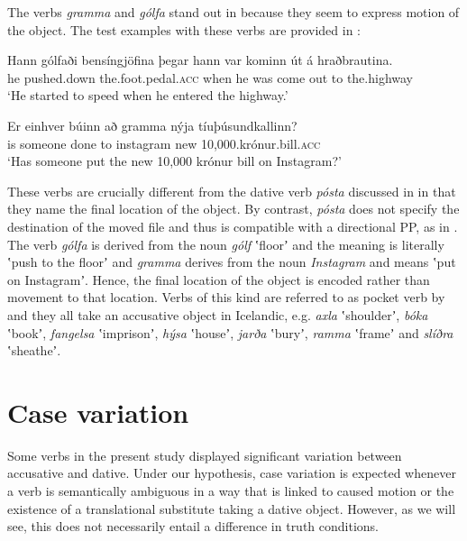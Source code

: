 \documentclass[output=paper,modfonts,nonflat,colorlinks,citecolor=brown]{langsci/langscibook}
\begin{document}
The verbs \textit{gramma} and \textit{gólfa} stand out in  because they seem to express motion of the object. The test examples with these verbs are provided in :



\ea%
    \label{ex:jonsson:6}
    \ea
\gll  Hann  gólfaði  bensíngjöfina  þegar  hann  var  kominn  út  á  hraðbrautina.\\
   he  pushed.down  the.foot.pedal.\textsc{acc}  when  he  was  come  out  to  the.highway\\
   \glt `He started to speed when he entered the highway.'

\ex
\gll   Er  einhver  búinn  að  gramma  nýja  tíuþúsundkallinn?\\
 is  someone  done  to  instagram  new  10,000.krónur.bill.\textsc{acc}\\
\glt `Has someone put the new 10,000 krónur bill on Instagram?'
\z
\z


These verbs are crucially different from the dative verb \textit{pósta} discussed in  in that they name the final location of the object. By contrast, \textit{pósta} does not specify the destination of the moved file and thus is compatible with a directional PP, as in . The verb \textit{gólfa} is derived from the noun \textit{gólf} ʽfloorʼ and the meaning is literally ʽpush to the floorʼ and \textit{gramma} derives from the noun \textit{Instagram} and means ʽput on Instagramʼ. Hence, the final location of the object is encoded rather than movement to that location. Verbs of this kind are referred to as pocket verb by \citet{Levin1993} and they all take an accusative object in Icelandic, e.g. \textit{axla} ʽshoulderʼ, \textit{bóka} ʽbookʼ, \textit{fangelsa} ʽimprisonʼ, \textit{hýsa} ʽhouseʼ, \textit{jarða} ʽburyʼ, \textit{ramma} ʽframeʼ and \textit{slíðra} ʽsheatheʼ.

\section{Case variation}  %
\label{sec:jonsson:4}

Some verbs in the present study displayed significant variation between accusative and dative. Under our hypothesis, case variation is expected whenever a verb is semantically ambiguous in a way that is linked to caused motion or the existence of a translational substitute taking a dative object. However, as we will see, this does not necessarily entail a difference in truth conditions.
\end{document}
